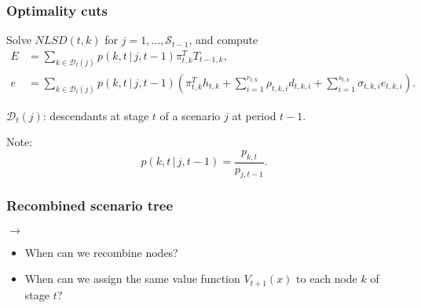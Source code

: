 \documentclass{beamer}
\def\DD{\mathcal{D}}
\def\KK{\mathcal{K}}
\def\KK{\mathcal{S}}
\begin{document}
\begin{frame}
\frametitle{Optimality cuts}
	
Solve $NLSD(t, k)$ for $j = 1,\ldots, \KK_{t-1}$, and compute
\begin{align*}
E &= \sum_{k \in \DD_t(j)} p(k, t\,|\,j, t - 1) \pi_{t,k}^T T_{t-1,k}, \\
e &= \sum_{k \in \DD_t(j)} p(k, t\,|\,j, t - 1) \left( \pi_{t,k}^T h_{t,k}
+ \sum_{i=1}^{r_{t,k}} \rho_{t,k,i} d_{t,k,i} + \sum_{i=1}^{s_{t,k}} \sigma_{t,k,i} e_{t,k,i} \right).
\end{align*}

$\DD_t(j)$: descendants at stage $t$ of a scenario $j$ at period $t - 1$.

\mbox{}

Note:
$$
p(k, t\,|\,j, t - 1) = \frac{p_{k,t}}{p_{j,t-1}}.
$$

\end{frame}

\begin{frame}
\frametitle{Recombined scenario tree}
	
\begin{center}

\begin{minipage}{0.44\textwidth}
\begin{small}
\end{small}
\end{minipage}
$\longrightarrow \qquad$
\begin{minipage}{0.44\textwidth}
\begin{small}
\end{small}
\end{minipage}
\begin{itemize}
	\item 
When can we recombine nodes?
	\item 
When can we assign the same value function $V_{t+1}(x)$ to
each node $k$ of stage $t$?
\end{itemize}

\end{center}

\end{frame}
\end{document}
